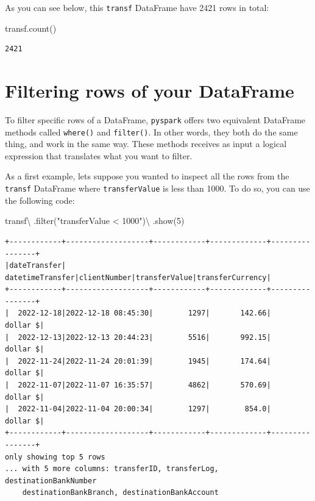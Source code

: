 \documentclass[
  11pt,
  letterpaper,
  DIV=11,
  numbers=noendperiod]{scrreprt}
\newenvironment{Shaded}{\begin{snugshade}}{\end{snugshade}}
\newcommand{\BuiltInTok}[1]{\textcolor[rgb]{0.00,0.23,0.31}{#1}}
\newcommand{\DecValTok}[1]{\textcolor[rgb]{0.68,0.00,0.00}{#1}}
\newcommand{\NormalTok}[1]{\textcolor[rgb]{0.00,0.23,0.31}{#1}}
\newcommand{\OperatorTok}[1]{\textcolor[rgb]{0.37,0.37,0.37}{#1}}
\newcommand{\StringTok}[1]{\textcolor[rgb]{0.13,0.47,0.30}{#1}}
\begin{document}
As you can see below, this \texttt{transf} DataFrame have 2421 rows in
total:

\begin{Shaded}
\begin{Highlighting}[]
\NormalTok{transf.count()}
\end{Highlighting}
\end{Shaded}

\begin{verbatim}
2421
\end{verbatim}

\hypertarget{filtering-rows-of-your-dataframe}{%
\section{Filtering rows of your
DataFrame}\label{filtering-rows-of-your-dataframe}}

To filter specific rows of a DataFrame, \texttt{pyspark} offers two
equivalent DataFrame methods called \texttt{where()} and
\texttt{filter()}. In other words, they both do the same thing, and work
in the same way. These methods receives as input a logical expression
that translates what you want to filter.

As a first example, lets suppose you wanted to inspect all the rows from
the \texttt{transf} DataFrame where \texttt{transferValue} is less than
1000. To do so, you can use the following code:

\begin{Shaded}
\begin{Highlighting}[]
\NormalTok{transf}\OperatorTok{\textbackslash{}}
\NormalTok{  .}\BuiltInTok{filter}\NormalTok{(}\StringTok{"transferValue \textless{} 1000"}\NormalTok{)}\OperatorTok{\textbackslash{}}
\NormalTok{  .show(}\DecValTok{5}\NormalTok{)}
\end{Highlighting}
\end{Shaded}

\begin{verbatim}
+------------+-------------------+------------+-------------+----------------+
|dateTransfer|   datetimeTransfer|clientNumber|transferValue|transferCurrency|
+------------+-------------------+------------+-------------+----------------+
|  2022-12-18|2022-12-18 08:45:30|        1297|       142.66|        dollar $|
|  2022-12-13|2022-12-13 20:44:23|        5516|       992.15|        dollar $|
|  2022-11-24|2022-11-24 20:01:39|        1945|       174.64|        dollar $|
|  2022-11-07|2022-11-07 16:35:57|        4862|       570.69|        dollar $|
|  2022-11-04|2022-11-04 20:00:34|        1297|        854.0|        dollar $|
+------------+-------------------+------------+-------------+----------------+
only showing top 5 rows
... with 5 more columns: transferID, transferLog, destinationBankNumber
    destinationBankBranch, destinationBankAccount
\end{verbatim}
\end{document}

